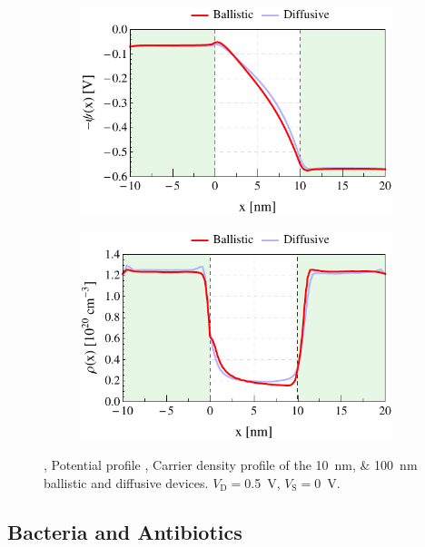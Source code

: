 \documentclass[11pt, a4paper]{article}
\newcommand{\sub}[1]{\ensuremath{_{\mathrm{#1}}}}
\newcommand{\Vd}{\ensuremath{V\sub{D}}}
\newcommand{\Vs}{\ensuremath{V\sub{S}}}
\begin{document}
\begin{figure}[t]
\begin{subfigure}{0.245\linewidth}
		\includegraphics[width=1\linewidth]{potxBallDiff10}
		\caption{}\label{fig:1c}
	\end{subfigure}
	\begin{subfigure}{0.245\linewidth}
		\centering
		\includegraphics[width=1\linewidth]{ndxBallDiff10}
		\caption{}\label{fig:1d}
	\end{subfigure}
	\caption{, Potential
	profile , Carrier density
	profile of the \SIlist{10;100}{\nm} ballistic and diffusive devices.
	$\Vd=$\SI{0.5}{V}, $\Vs=$\SI{0}{V}.}
	\label{fig:1}
\end{figure}%

\subsection{Bacteria and Antibiotics}
\Blindtext
\end{document}
